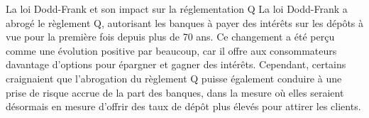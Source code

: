 \begin{frame}{La loi Dodd-Frank et son impact sur la réglementation Q}
   La loi Dodd-Frank a abrogé le règlement Q, autorisant les banques à payer des intérêts sur les dépôts à vue pour la première fois depuis plus de 70 ans. Ce changement a été perçu comme une évolution positive par beaucoup, car il offre aux consommateurs davantage d’options pour épargner et gagner des intérêts. Cependant, certains craignaient que l'abrogation du règlement Q puisse également conduire à une prise de risque accrue de la part des banques, dans la mesure où elles seraient désormais en mesure d'offrir des taux de dépôt plus élevés pour attirer les clients. 
\end{frame}